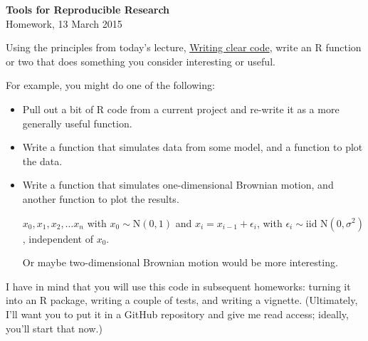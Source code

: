 \documentclass[12pt]{article}
\begin{document}
\thispagestyle{empty}

\textbf{Tools for Reproducible Research} \\
Homework, 13 March 2015

\bigskip

Using the principles from today's lecture,
\href{http://kbroman.org/Tools4RR/assets/today'sectures/07_clearcode.pdf}{Writing
  clear code}, write an R function or two that does something you
consider interesting or useful.

For example, you might do one of the following:

\begin{itemize}

\item Pull out a bit of R code from a current project and re-write it
  as a more generally useful function.

\item Write a function that simulates data from some model, and a
  function to plot the data.

\item Write a function that simulates one-dimensional Brownian motion,
  and another function to plot the results.

  $x_0, x_1, x_2, \dots x_n$ with $x_0 \sim \text{N}(0,1)$ and
  $x_i = x_{i-1} + \epsilon_i$, with $\epsilon_i \sim \text{iid }
  \text{N}(0, \sigma^2)$, independent of $x_0$.

  Or maybe two-dimensional Brownian motion would be more interesting.

\end{itemize}

I have in mind that you will use this code in subsequent homeworks:
turning it into an R package, writing a couple of tests, and writing a
vignette. (Ultimately, I'll want you to put it in a GitHub repository
and give me read access; ideally, you'll start that now.)
\end{document}
